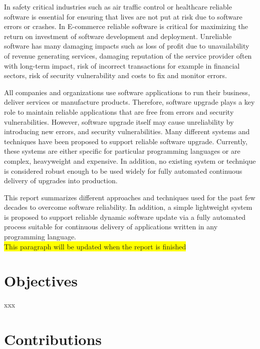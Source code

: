 \documentclass[a4paper,11pt,twoside]{report}
\begin{document}
In safety critical industries such as air traffic control or healthcare reliable software is essential for ensuring that lives are not put at risk due to software errors or crashes. In E-commerce reliable software is critical for maximizing the return on investment of software development and deployment. Unreliable software has many damaging impacts such as loss of profit due to unavailability of revenue generating services, damaging reputation of the service provider often with long-term impact, risk of incorrect transactions for example in financial sectors, risk of security vulnerability and costs to fix and monitor errors.

All companies and organizations use software applications to run their business, deliver services or manufacture products. Therefore, software upgrade plays a key role to maintain reliable applications that are free from errors and security vulnerabilities. However, software upgrade itself may cause unreliability by introducing new errors, and security vulnerabilities. Many different systems and techniques have been proposed to support reliable software upgrade. Currently, these systems are either specific for particular programming languages or are complex, heavyweight and expensive. In addition, no existing system or technique is considered robust enough to be used widely for fully automated continuous delivery of upgrades into production.
 
{\color{red}This report summarizes different approaches and techniques used for the past few decades to overcome software reliability. In addition, a simple lightweight system is proposed to support reliable dynamic software update via a fully automated process suitable for continuous delivery of applications written in any programming language.}\\  
\colorbox{yellow}{This paragraph will be updated when the report is finished}

\section{Objectives}
xxx

\section{Contributions}
\end{document}
